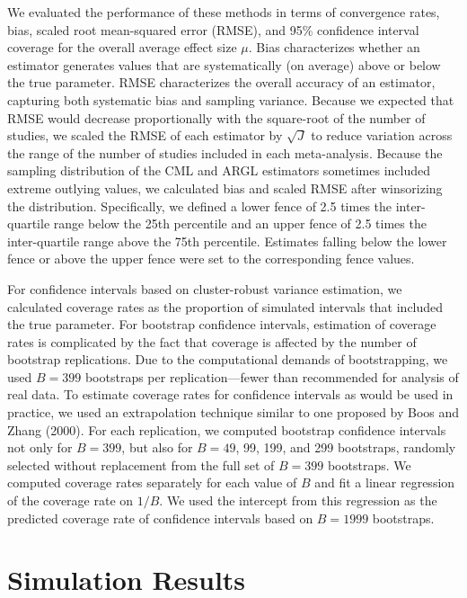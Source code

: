 \documentclass[
  man, donotrepeattitle,floatsintext]{apa7}
\begin{document}
We evaluated the performance of these methods in terms of convergence rates, bias,
scaled root mean-squared error (RMSE), and 95\% confidence interval coverage for the overall average effect size \(\mu\).
Bias characterizes whether an estimator generates values that are systematically (on average) above or below
the true parameter.
RMSE characterizes the overall accuracy of an estimator, capturing both systematic bias and sampling variance.
Because we expected that RMSE would decrease proportionally with the square-root of the number of studies, we scaled the RMSE of each estimator by \(\sqrt{J}\) to reduce variation across the range of the number of studies included in each meta-analysis.
Because the sampling distribution of the CML and ARGL estimators sometimes included extreme outlying values, we calculated bias and scaled RMSE after winsorizing the distribution.
Specifically, we defined a lower fence of 2.5 times the inter-quartile range below the 25th percentile and an upper fence of 2.5 times the inter-quartile range above the 75th percentile.
Estimates falling below the lower fence or above the upper fence were set to the corresponding fence values.

For confidence intervals based on cluster-robust variance estimation, we calculated coverage rates as the proportion of simulated intervals that included the true parameter.
For bootstrap confidence intervals, estimation of coverage rates is complicated by the fact that coverage is affected by the number of bootstrap replications.
Due to the computational demands of bootstrapping, we used \(B = 399\) bootstraps per replication---fewer than recommended for analysis of real data.
To estimate coverage rates for confidence intervals as would be used in practice, we used an extrapolation technique similar to one proposed by Boos and Zhang (2000).
For each replication, we computed bootstrap confidence intervals not only for \(B = 399\), but also for \(B = 49\), 99, 199, and 299 bootstraps, randomly selected without replacement from the full set of \(B = 399\) bootstraps.
We computed coverage rates separately for each value of \(B\) and fit a linear regression of the coverage rate on \(1 / B\).
We used the intercept from this regression as the predicted coverage rate of confidence intervals based on \(B = 1999\) bootstraps.

\section{Simulation Results}\label{simulation-results}
\end{document}
